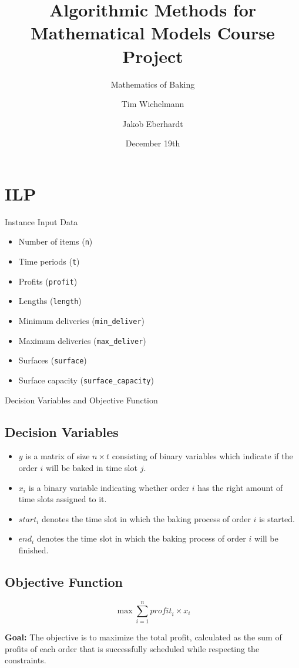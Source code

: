 \documentclass[presentation]{beamer}
\title{Algorithmic Methods for Mathematical Models Course Project}
\subtitle{Mathematics of Baking}
\author{Tim Wichelmann \and Jakob Eberhardt}
\date{December 19th}
\begin{document}
\frame{\titlepage}
\section{ILP}
\begin{frame}{Instance Input Data}
\begin{itemize}
    \item Number of items (\texttt{n})
    \item Time periods (\texttt{t})
    \item Profits (\texttt{profit})
    \item Lengths (\texttt{length})
    \item Minimum deliveries (\texttt{min\_deliver})
    \item Maximum deliveries (\texttt{max\_deliver})
    \item Surfaces (\texttt{surface})
    \item Surface capacity (\texttt{surface\_capacity})
\end{itemize}
\end{frame}

\begin{frame}{Decision Variables and Objective Function}

\subsection{Decision Variables}
\begin{itemize}
    \item \( y \) is a matrix of size \( n \times t \) consisting of binary variables which indicate if the order \( i \) will be baked in time slot \( j \).
    \item \( x_i \) is a binary variable indicating whether order \( i \) has the right amount of time slots assigned to it.
    \item \( \mathit{start}_i \) denotes the time slot in which the baking process of order \( i \) is started.
    \item \( \mathit{end}_i \) denotes the time slot in which the baking process of order \( i \) will be finished.
\end{itemize}

\subsection{Objective Function}
\begin{equation*}
  \max \sum^n_{i = 1} \mathit{profit}_i \times x_i
\end{equation*}

\textbf{Goal:} The objective is to maximize the total profit, calculated as the sum of profits of each order that is successfully scheduled while respecting the constraints.
\end{frame}
\end{document}
